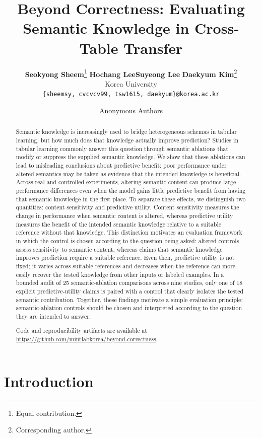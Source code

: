 \documentclass{article} %
\title{Beyond Correctness: Evaluating Semantic Knowledge in Cross-Table Transfer}
\author{\normalfont
\textbf{Seokyong Sheem}\thanks{Equal contribution.} \quad \textbf{Hochang Lee}\footnotemark[1] \quad \textbf{Suyeong Lee} \quad \textbf{Daekyum Kim}\thanks{Corresponding author.} \\
Korea University \\
\texttt{\{sheemsy, cvcvcv99, tsw1615, daekyum\}@korea.ac.kr}
}
\author{Anonymous Authors}
\begin{document}
\maketitle
\ifdefined\ICLRArxivVersion
\lhead{}
\fi
\begin{abstract}

Semantic knowledge is increasingly used to bridge heterogeneous schemas in tabular learning, but how much does that knowledge actually improve prediction?
Studies in tabular learning commonly answer this question through semantic ablations that modify or suppress the supplied semantic knowledge.
We show that these ablations can lead to misleading conclusions about predictive benefit: poor performance under altered semantics may be taken as evidence that the intended knowledge is beneficial.
Across real and controlled experiments, altering semantic content can produce large performance differences even when the model gains little predictive benefit from having that semantic knowledge in the first place.
To separate these effects, we distinguish two quantities: content sensitivity and predictive utility. 
Content sensitivity measures the change in performance when semantic content is altered, whereas predictive utility measures the benefit of the intended semantic knowledge relative to a suitable reference without that knowledge.
This distinction motivates an evaluation framework in which the control is chosen according to the question being asked: altered controls assess sensitivity to semantic content, whereas claims that semantic knowledge improves prediction require a suitable reference.
Even then, predictive utility is not fixed; it varies across suitable references and decreases when the reference can more easily recover the tested knowledge from other inputs or labeled examples.
In a bounded audit of 25 semantic-ablation comparisons across nine studies, only one of 18 explicit predictive-utility claims is paired with a control that clearly isolates the tested semantic contribution.
Together, these findings motivate a simple evaluation principle: semantic-ablation controls should be chosen and interpreted according to the question they are intended to answer. 

Code and reproducibility artifacts are available at \url{https://github.com/mintlabkorea/beyond-correctness}.

\end{abstract}

\section{Introduction}
\end{document}
